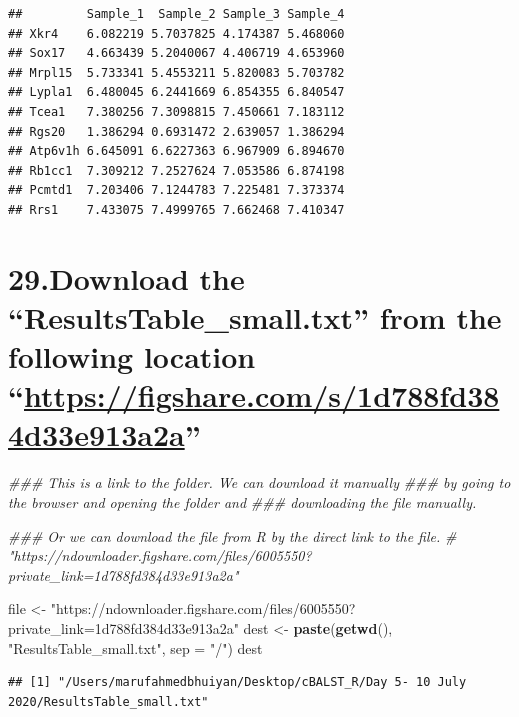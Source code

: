 \documentclass[]{article}
\newenvironment{Shaded}{\begin{snugshade}}{\end{snugshade}}
\newcommand{\CommentTok}[1]{\textcolor[rgb]{0.56,0.35,0.01}{\textit{#1}}}
\newcommand{\DataTypeTok}[1]{\textcolor[rgb]{0.13,0.29,0.53}{#1}}
\newcommand{\KeywordTok}[1]{\textcolor[rgb]{0.13,0.29,0.53}{\textbf{#1}}}
\newcommand{\NormalTok}[1]{#1}
\newcommand{\StringTok}[1]{\textcolor[rgb]{0.31,0.60,0.02}{#1}}
\begin{document}
\begin{verbatim}
##         Sample_1  Sample_2 Sample_3 Sample_4
## Xkr4    6.082219 5.7037825 4.174387 5.468060
## Sox17   4.663439 5.2040067 4.406719 4.653960
## Mrpl15  5.733341 5.4553211 5.820083 5.703782
## Lypla1  6.480045 6.2441669 6.854355 6.840547
## Tcea1   7.380256 7.3098815 7.450661 7.183112
## Rgs20   1.386294 0.6931472 2.639057 1.386294
## Atp6v1h 6.645091 6.6227363 6.967909 6.894670
## Rb1cc1  7.309212 7.2527624 7.053586 6.874198
## Pcmtd1  7.203406 7.1244783 7.225481 7.373374
## Rrs1    7.433075 7.4999765 7.662468 7.410347
\end{verbatim}

\hypertarget{download-the-resultstable_small.txt-from-the-following-location-httpsfigshare.coms1d788fd384d33e913a2a}{%
\section{\texorpdfstring{29.Download the ``ResultsTable\_small.txt''
from the following location
``\url{https://figshare.com/s/1d788fd384d33e913a2a}''}{29.Download the ``ResultsTable\_small.txt'' from the following location ``https://figshare.com/s/1d788fd384d33e913a2a''}}\label{download-the-resultstable_small.txt-from-the-following-location-httpsfigshare.coms1d788fd384d33e913a2a}}

\begin{Shaded}
\begin{Highlighting}[]
\CommentTok{### This is a link to the folder. We can download it manually }
\CommentTok{### by going to the browser and opening the folder and }
\CommentTok{### downloading the file manually.}

\CommentTok{### Or we can download the file from R by the direct link to the file.}
\CommentTok{# "https://ndownloader.figshare.com/files/6005550?private_link=1d788fd384d33e913a2a"}

\NormalTok{file <-}\StringTok{ }
\StringTok{  "https://ndownloader.figshare.com/files/6005550?private_link=1d788fd384d33e913a2a"}
\NormalTok{dest <-}\StringTok{ }\KeywordTok{paste}\NormalTok{(}\KeywordTok{getwd}\NormalTok{(), }\StringTok{"ResultsTable_small.txt"}\NormalTok{, }\DataTypeTok{sep =} \StringTok{"/"}\NormalTok{)}
\NormalTok{dest}
\end{Highlighting}
\end{Shaded}

\begin{verbatim}
## [1] "/Users/marufahmedbhuiyan/Desktop/cBALST_R/Day 5- 10 July 2020/ResultsTable_small.txt"
\end{verbatim}
\end{document}

